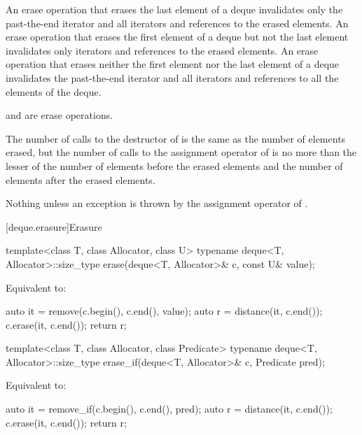\begin{itemdescr}
\pnum
\effects
An erase operation that erases the last element of a deque invalidates only the past-the-end iterator
and all iterators and references to the erased elements. An erase operation that erases the first
element of a deque but not the last element invalidates only iterators
and references to the erased elements. An erase operation
that erases neither the first element nor the last element of a deque invalidates the past-the-end
iterator and all iterators and references to all the elements of the deque.
\begin{note}
 and  are erase operations.
\end{note}

\pnum
\complexity
The number of calls to the destructor of  is the same as the
number of elements erased, but the number of calls to the assignment operator of  is
no more than the lesser of the number of elements before the erased elements and the number of elements after the erased elements.

\pnum
\throws
Nothing unless an exception is thrown by the assignment operator of
.
\end{itemdescr}

[deque.erasure]{Erasure}

%
\begin{itemdecl}
template<class T, class Allocator, class U>
  typename deque<T, Allocator>::size_type
    erase(deque<T, Allocator>& c, const U& value);
\end{itemdecl}

\begin{itemdescr}
\pnum
\effects
Equivalent to:
\begin{codeblock}
auto it = remove(c.begin(), c.end(), value);
auto r = distance(it, c.end());
c.erase(it, c.end());
return r;
\end{codeblock}
\end{itemdescr}

%
\begin{itemdecl}
template<class T, class Allocator, class Predicate>
  typename deque<T, Allocator>::size_type
    erase_if(deque<T, Allocator>& c, Predicate pred);
\end{itemdecl}

\begin{itemdescr}
\pnum
\effects
Equivalent to:
\begin{codeblock}
auto it = remove_if(c.begin(), c.end(), pred);
auto r = distance(it, c.end());
c.erase(it, c.end());
return r;
\end{codeblock}
\end{itemdescr}

